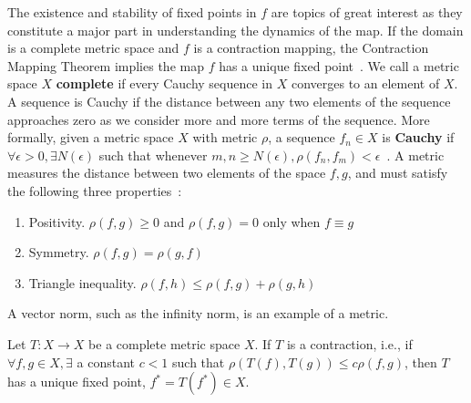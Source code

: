 The existence and stability of fixed points in $f$ are topics of great
interest as they constitute a major part in understanding the
dynamics of the map. If the domain is a complete metric space and $f$ is a contraction
mapping, the Contraction Mapping Theorem implies the map $f$ has a unique
fixed point~\cite{meiss}. We call a metric space $X$ \textbf{complete} if every
Cauchy sequence in $X$ converges to an element of $X$. A sequence is
Cauchy if the distance between any two elements of the sequence
approaches zero as we consider more and more terms of the
sequence. More formally, given a metric space $X$ with metric $\rho$, a sequence $f_n \in X$ is \textbf{Cauchy} if
$\forall \epsilon>0, \exists N(\epsilon)$ such that whenever $m,n \geq
N(\epsilon), \rho(f_n,f_m)<\epsilon$~\cite{meiss}. A metric measures
the distance between two elements of the space $f,g$, and must satisfy the following three
properties~\cite{meiss}:
\begin{enumerate}
\item Positivity. $\rho(f,g) \geq 0$ and $\rho(f,g)=0$ only when $f
  \equiv g$
\item Symmetry. $\rho(f,g) = \rho(g,f)$
\item Triangle inequality. $\rho(f,h) \leq \rho(f,g) + \rho(g,h)$
\end{enumerate}
A vector norm, such as the infinity norm, is an example of a metric. 
\begin{singlespace}
\begin{theorem}\label{thm:contraction}
Let $T:X\to X$ be a complete metric space $X$. If $T$ is a
contraction, i.e., if $\forall f,g \in X, \exists$ a constant $c<1$
such that $\rho(T(f),T(g)) \leq c\rho(f,g)$, then $T$ has a unique
fixed point, $f^* = T(f^*) \in X$.
\end{theorem}
\end{singlespace}

